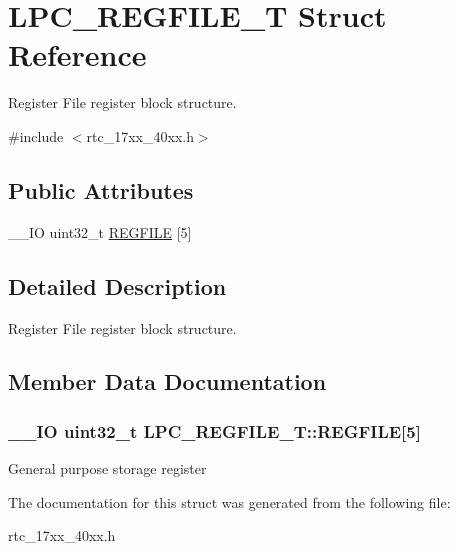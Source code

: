 \hypertarget{struct_l_p_c___r_e_g_f_i_l_e___t}{\section{L\+P\+C\+\_\+\+R\+E\+G\+F\+I\+L\+E\+\_\+\+T Struct Reference}
\label{struct_l_p_c___r_e_g_f_i_l_e___t}
}


Register File register block structure.  




{\ttfamily \#include $<$rtc\+\_\+17xx\+\_\+40xx.\+h$>$}

\subsection*{Public Attributes}
\begin{DoxyCompactItemize}
\item 
\+\_\+\+\_\+\+I\+O uint32\+\_\+t \hyperlink{struct_l_p_c___r_e_g_f_i_l_e___t_ae61f3de82503d032642cbdd27a4a160d}{R\+E\+G\+F\+I\+L\+E} \mbox{[}5\mbox{]}
\end{DoxyCompactItemize}


\subsection{Detailed Description}
Register File register block structure. 

\subsection{Member Data Documentation}
\hypertarget{struct_l_p_c___r_e_g_f_i_l_e___t_ae61f3de82503d032642cbdd27a4a160d}{
\subsubsection[{R\+E\+G\+F\+I\+L\+E}]{\setlength{\rightskip}{0pt plus 5cm}\+\_\+\+\_\+\+I\+O uint32\+\_\+t L\+P\+C\+\_\+\+R\+E\+G\+F\+I\+L\+E\+\_\+\+T\+::\+R\+E\+G\+F\+I\+L\+E\mbox{[}5\mbox{]}}}\label{struct_l_p_c___r_e_g_f_i_l_e___t_ae61f3de82503d032642cbdd27a4a160d}
General purpose storage register 

The documentation for this struct was generated from the following file\+:\begin{DoxyCompactItemize}
\item 
rtc\+\_\+17xx\+\_\+40xx.\+h\end{DoxyCompactItemize}
